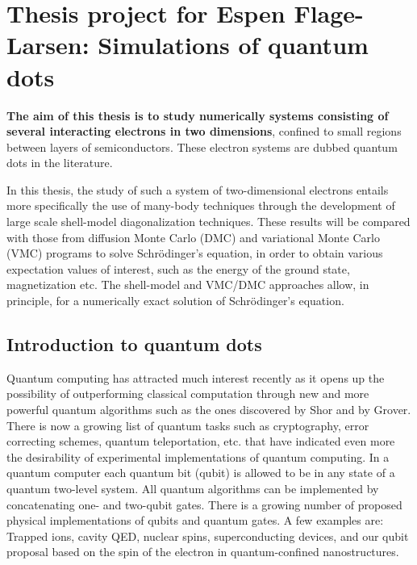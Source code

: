 \newcommand{\OP}[1]{{\bf\widehat{#1}}}

\newcommand{\be}{\begin{equation}}

\newcommand{\ee}{\end{equation}}
\newcommand{\bra}[1]{\left\langle #1 \right|}
\newcommand{\ket}[1]{\left| #1 \right\rangle}
\newcommand{\braket}[2]{\left\langle #1 \right| #2 \right\rangle}




\pagestyle{plain}

\section*{Thesis project for Espen Flage-Larsen:  Simulations of quantum dots}

{\bf The aim of this thesis is to study numerically systems consisting of several
interacting electrons in two dimensions}, confined to small regions
between layers of semiconductors. 
These electron systems
are dubbed quantum dots in the literature. 

In this thesis,
the study of such a system of two-dimensional electrons 
entails more specifically the use of many-body techniques through the 
development of large scale shell-model diagonalization techniques. These results will be compared 
with those from  
diffusion Monte Carlo  (DMC) and variational Monte Carlo (VMC) programs 
to solve Schr\"odinger's equation, in order to obtain various expectation values of interest, 
such as the energy
of the ground state, magnetization etc. 
The shell-model and VMC/DMC approaches allow, in principle, for a numerically
exact solution of Schr\"odinger's equation. 


\subsection*{Introduction to quantum dots}

Quantum computing has attracted much interest 
recently as it opens up the possibility of outperforming 
classical computation through new and more powerful quantum algorithms
such as the ones discovered by Shor and by Grover. 
There is now a growing list of quantum tasks 
such as cryptography, error correcting schemes, quantum
teleportation, etc. that have indicated even more the desirability 
of experimental implementations of quantum computing. 
In a quantum computer each quantum bit (qubit) is allowed
to be in any state of a quantum two-level system. 
All quantum algorithms can be implemented by 
concatenating one- and two-qubit gates. There is a growing number of proposed
physical implementations of qubits and quantum gates. 
A few examples are: Trapped ions, cavity QED, nuclear spins, 
superconducting devices, and
our qubit proposal 
based on the spin of the electron in quantum-confined nanostructures. 

